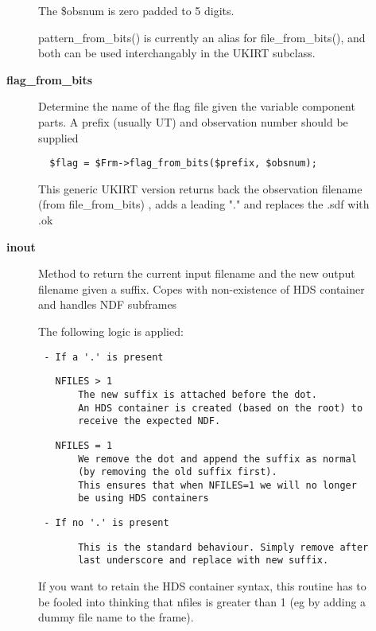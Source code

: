 \begin{description}
\begin{description}
The \$obsnum is zero padded to 5 digits.



pattern\_from\_bits() is currently an alias for file\_from\_bits(),
and both can be used interchangably in the UKIRT subclass.


\item[{\textbf{flag\_from\_bits}}] \mbox{}

Determine the name of the flag file given the variable
component parts. A prefix (usually UT) and observation number
should be supplied

\begin{verbatim}
  $flag = $Frm->flag_from_bits($prefix, $obsnum);
\end{verbatim}


This generic UKIRT version returns back the observation filename (from
file\_from\_bits) , adds a leading "." and replaces the .sdf with .ok


\item[{\textbf{inout}}] \mbox{}

Method to return the current input filename and the new output
filename given a suffix.  Copes with non-existence of HDS container
and handles NDF subframes



The following logic is applied:

\begin{verbatim}
 - If a '.' is present
\end{verbatim}
\begin{verbatim}
   NFILES > 1
       The new suffix is attached before the dot.
       An HDS container is created (based on the root) to
       receive the expected NDF.
\end{verbatim}
\begin{verbatim}
   NFILES = 1
       We remove the dot and append the suffix as normal
       (by removing the old suffix first).
       This ensures that when NFILES=1 we will no longer
       be using HDS containers
\end{verbatim}
\begin{verbatim}
 - If no '.' is present
\end{verbatim}
\begin{verbatim}
       This is the standard behaviour. Simply remove after
       last underscore and replace with new suffix.
\end{verbatim}


If you want to retain the HDS container syntax, this routine has to be
fooled into thinking that nfiles is greater than 1 (eg by adding a dummy
file name to the frame).




\end{description}
\end{description}
